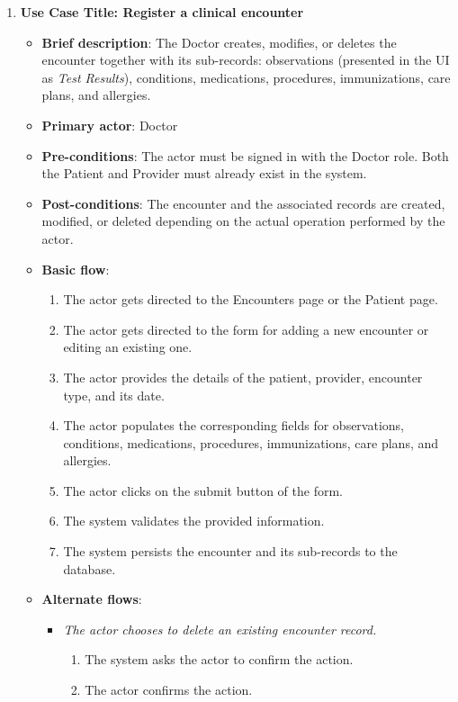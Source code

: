 \begin{enumerate}
\vspace{0.5em}

\item \textbf{Use Case Title: Register a clinical encounter}
\begin{itemize}
    \item \textbf{Brief description}: The Doctor creates, modifies, or deletes the encounter together with its sub-records: observations (presented in the UI as \emph{Test Results}), conditions, medications, procedures, immunizations, care plans, and allergies.
    \item \textbf{Primary actor}: Doctor
    \item \textbf{Pre-conditions}: The actor must be signed in with the Doctor role. Both the Patient and Provider must already exist in the system.
    \item \textbf{Post-conditions}: The encounter and the associated records are created, modified, or deleted depending on the actual operation performed by the actor.
    \item \textbf{Basic flow}:
    \begin{enumerate}
        \item The actor gets directed to the Encounters page or the Patient page.
        \item The actor gets directed to the form for adding a new encounter or editing an existing one.
        \item The actor provides the details of the patient, provider, encounter type, and its date.
        \item The actor populates the corresponding fields for observations, conditions, medications, procedures, immunizations, care plans, and allergies.
        \item The actor clicks on the submit button of the form.
        \item The system validates the provided information.
        \item The system persists the encounter and its sub-records to the database.
    \end{enumerate}
    \item \textbf{Alternate flows}:
    \begin{itemize}
        \item[2a.] \textit{The actor chooses to delete an existing encounter record.}
        \begin{enumerate}
            \item The system asks the actor to confirm the action.
            \item The actor confirms the action.

\end{enumerate}
\end{itemize}
\end{itemize}
\end{enumerate}
